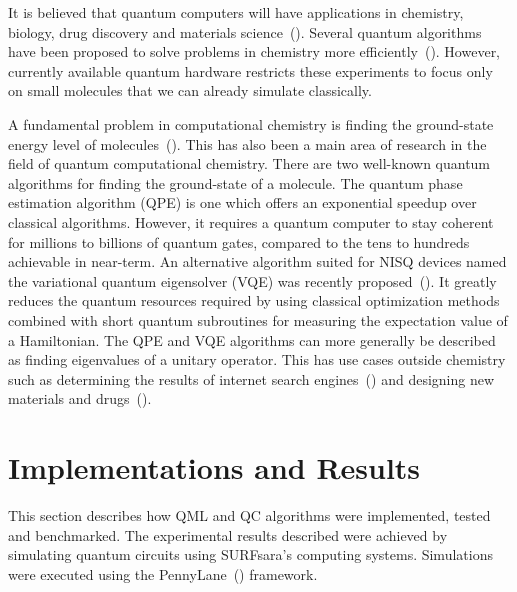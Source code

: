 \documentclass[a4paper,10pt]{article}
\begin{document}
It is believed that quantum computers will have applications in chemistry, biology, drug discovery and materials science~(\cite{mcardle2018quantum}).
Several quantum algorithms have been proposed to solve problems in chemistry more efficiently~(\cite{lidar1999calculating, kassal2008polynomial, aspuru2005simulated, vqe}).
However, currently available quantum hardware restricts these experiments to focus only on small molecules that we can already simulate classically.

A fundamental problem in computational chemistry is finding the ground-state energy level of molecules~(\cite{aspuru2005simulated}).
This has also been a main area of research in the field of quantum computational chemistry.
There are two well-known quantum algorithms for finding the ground-state of a molecule.
The quantum phase estimation algorithm (QPE) is one which offers an exponential speedup over classical algorithms.
However, it requires a quantum computer to stay coherent for millions to billions of quantum gates, compared to the tens to hundreds achievable in near-term.
An alternative algorithm suited for NISQ devices named the variational quantum eigensolver (VQE) was recently proposed~(\cite{vqe}).
It greatly reduces the quantum resources required by using classical optimization methods combined with short quantum subroutines for measuring the expectation value of a Hamiltonian.
The QPE and VQE algorithms can more generally be described as finding eigenvalues of a unitary operator.
This has use cases outside chemistry such as determining the results of internet search engines~(\cite{page1999pagerank}) and designing new materials and drugs~(\cite{golub2000eigenvalue}).

\section{Implementations and Results} \label{sec:implementation-and-results}
This section describes how QML and QC algorithms were implemented, tested and benchmarked.
The experimental results described were achieved by simulating quantum circuits using SURFsara's computing systems.
Simulations were executed using the PennyLane~(\cite{bergholm2018pennylane}) framework.
\end{document}
